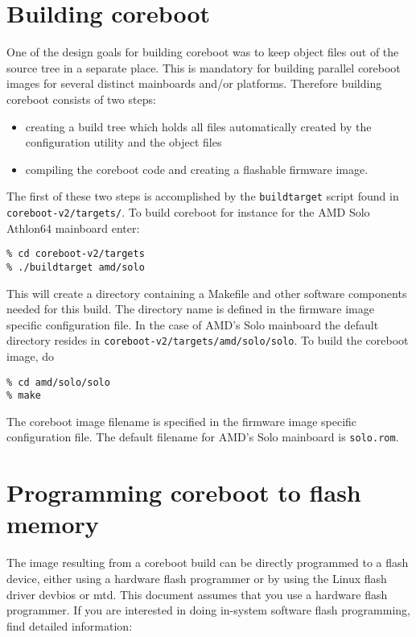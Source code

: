 \documentclass[titlepage,12pt]{article}
\begin{document}
\section{Building coreboot}
One of the design goals for building coreboot was to keep object files
out of the source tree in a separate place. This is mandatory for
building parallel coreboot images for several distinct mainboards
and/or platforms. Therefore building coreboot consists of two steps:
\begin{itemize}
\item
creating a build tree which holds all files automatically created by the
configuration utility and the object files
\item
compiling the coreboot code and creating a flashable firmware image.
\end{itemize}

The first of these two steps is accomplished by the \texttt{buildtarget}
script found in \texttt{coreboot-v2/targets/}. To build coreboot for
instance for the AMD Solo Athlon64 mainboard enter:

\begin{verbatim}
% cd coreboot-v2/targets
% ./buildtarget amd/solo
\end{verbatim}

This will create a directory containing a Makefile and other software
components needed for this build. The directory name is defined in the
firmware image specific configuration file. In the case of AMD's Solo
mainboard the default directory resides in
\texttt{coreboot-v2/targets/amd/solo/solo}. To build the coreboot image, do

\begin{verbatim}
% cd amd/solo/solo
% make
\end{verbatim}

The coreboot image filename is specified in the firmware image specific
configuration file. The default filename for AMD's Solo mainboard is
\texttt{solo.rom}.

%
%

\section{Programming coreboot to flash memory}
The image resulting from a coreboot build can be directly programmed to
a flash device, either using a hardware flash programmer or by using the
Linux flash driver devbios or mtd. This document assumes that you use a
hardware flash programmer. If you are interested in doing in-system
software flash programming, find detailed information:
\end{document}
